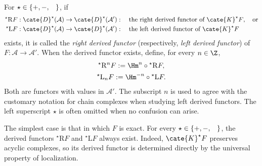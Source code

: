 \begin{definition}\label{def:derived-functor}
	 
	For $\star\in\{+,-,\hspace{0.8em}\}$, if
	\begin{align*}
		{}^\star \mathrm{R}F: \cate{D}^\star(\mathcal{A}) & \to \cate{D}^\star(\mathcal{A}'): \quad \text{the right derived functor of $\cate{K}^\star F$}, \quad \text{or} \\
		{}^\star \mathrm{L}F: \cate{D}^\star(\mathcal{A}) & \to \cate{D}^\star(\mathcal{A}'): \quad \text{the left derived functor of $\cate{K}^\star F$}
	\end{align*}
	exists, it is called the \emph{right derived functor} (respectively,
	\emph{left derived functor}) of $F:\mathcal{A}\to\mathcal{A}'$. When the
	derived functor exists, define, for every $n\in\Z$,
	\begin{gather*}
		{}^\star \mathrm{R}^n F := \Hm^n \circ {}^\star \mathrm{R}F, \\
		{}^\star \mathrm{L}_n F := \Hm^{-n} \circ {}^\star \mathrm{L}F.
	\end{gather*}
	Both are functors with values in $\mathcal{A}'$. The subscript $n$ is used
	to agree with the customary notation for chain complexes when studying left
	derived functors. The left superscript $\star$ is often omitted when no
	confusion can arise.
\end{definition}

\begin{example}
	The simplest case is that in which $F$ is exact. For every
	$\star\in\{+,-,\hspace{0.8em}\}$, the derived functors
	${}^\star\mathrm{R}F$ and ${}^\star\mathrm{L}F$ always exist. Indeed,
	$\cate{K}^\star F$ preserves acyclic complexes, so its derived functor is
	determined directly by the universal property of localization.
\end{example}

